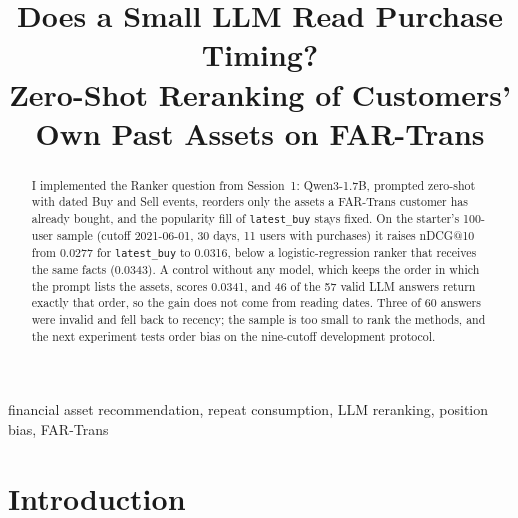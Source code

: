 \documentclass[conference]{IEEEtran}
\begin{document}
\title{Does a Small LLM Read Purchase Timing?\\Zero-Shot Reranking of Customers' Own Past Assets on FAR-Trans}

\author{
}

\maketitle

\begin{abstract}
I implemented the Ranker question from Session~1: Qwen3-1.7B, prompted zero-shot with dated Buy and Sell events, reorders only the assets a FAR-Trans customer has already bought, and the popularity fill of \texttt{latest\_buy} stays fixed. On the starter's 100-user sample (cutoff 2021-06-01, 30 days, 11 users with purchases) it raises nDCG@10 from 0.0277 for \texttt{latest\_buy} to 0.0316, below a logistic-regression ranker that receives the same facts (0.0343). A control without any model, which keeps the order in which the prompt lists the assets, scores 0.0341, and 46 of the 57 valid LLM answers return exactly that order, so the gain does not come from reading dates. Three of 60 answers were invalid and fell back to recency; the sample is too small to rank the methods, and the next experiment tests order bias on the nine-cutoff development protocol.
\end{abstract}

\begin{IEEEkeywords}
financial asset recommendation, repeat consumption, LLM reranking, position bias, FAR-Trans
\end{IEEEkeywords}

\section{Introduction}
\end{document}
